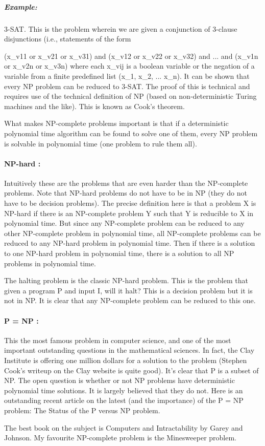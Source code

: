 \documentclass[12pt]{article}
\begin{document}
\subparagraph{\textit{Example:}} 3-SAT. This is the problem wherein we are given a conjunction of 3-clause disjunctions (i.e., statements of the form

(x\_v11 or x\_v21 or x\_v31) and 
(x\_v12 or x\_v22 or x\_v32) and 
...                       and 
(x\_v1n or x\_v2n or x\_v3n)
where each x\_vij is a boolean variable or the negation of a variable from a finite predefined list (x\_1, x\_2, ... x\_n). It can be shown that every NP problem can be reduced to 3-SAT. The proof of this is technical and requires use of the technical definition of NP (based on non-deterministic Turing machines and the like). This is known as Cook's theorem.

What makes NP-complete problems important is that if a deterministic polynomial time algorithm can be found to solve one of them, every NP problem is solvable in polynomial time (one problem to rule them all).

\paragraph{NP-hard :} Intuitively these are the problems that are even harder than the NP-complete problems. Note that NP-hard problems do not have to be in NP (they do not have to be decision problems). The precise definition here is that a problem X is NP-hard if there is an NP-complete problem Y such that Y is reducible to X in polynomial time. But since any NP-complete problem can be reduced to any other NP-complete problem in polynomial time, all NP-complete problems can be reduced to any NP-hard problem in polynomial time. Then if there is a solution to one NP-hard problem in polynomial time, there is a solution to all NP problems in polynomial time.

The halting problem is the classic NP-hard problem. This is the problem that given a program P and input I, will it halt? This is a decision problem but it is not in NP. It is clear that any NP-complete problem can be reduced to this one.

\paragraph{P = NP :} This the most famous problem in computer science, and one of the most important outstanding questions in the mathematical sciences. In fact, the Clay Institute is offering one million dollars for a solution to the problem (Stephen Cook's writeup on the Clay website is quite good). It's clear that P is a subset of NP. The open question is whether or not NP problems have deterministic polynomial time solutions. It is largely believed that they do not. Here is an outstanding recent article on the latest (and the importance) of the P = NP problem: The Status of the P versus NP problem.

The best book on the subject is Computers and Intractability by Garey and Johnson. My favourite NP-complete problem is the Minesweeper problem.


\end{document}
